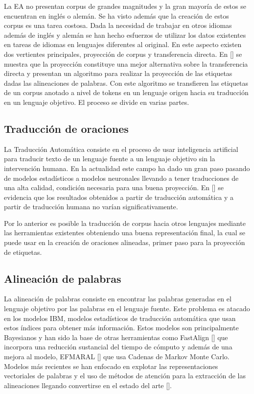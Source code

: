 La EA no presentan corpus de grandes magnitudes y la gran mayoría de estos se encuentran en inglés o alemán. 
Se ha visto además que la creación de estos corpus es una tarea costosa. Dada la necesidad de trabajar en otros idiomas además de
inglés y alemán se han hecho esfuerzos de utilizar los datos existentes en tareas de idiomas en lenguajes 
diferentes al original. En este aspecto existen dos vertientes principales, proyección de corpus y transferencia
directa. En [\cite{eger2018cross}] se muestra que la proyección constituye una mejor alternativa sobre la transferencia
directa y presentan un algoritmo para realizar la proyección de las etiquetas dadas las alineaciones de palabras.
Con este algoritmo se transfieren las etiquetas de un corpus anotado a nivel de tokens en un lenguaje origen 
hacia su traducción en un lenguaje objetivo. El proceso se divide en varias partes.

\subsection{Traducción de oraciones}

La Traducción Automática consiste en el proceso de usar inteligencia artificial para
traducir texto de un lenguaje fuente a un lenguaje objetivo sin la intervención humana.
En la actualidad este campo ha dado un gran paso pasando de modelos estadísticos a modelos
neuronales llevando a tener traducciones de una alta calidad, condición necesaria para una
buena proyección. En [\cite{eger2018cross}] se
evidencia que los resultados obtenidos a partir de traducción automática y a partir de 
traducción humana no varían significativamente. 

Por lo anterior es posible la traducción de corpus hacia otros lenguajes mediante las
herramientas existentes obteniendo una buena representación final, la cual se puede usar en la creación de
oraciones alineadas, primer paso para la proyección de etiquetas.

\subsection{Alineación de palabras}

La alineación de palabras consiste en encontrar las palabras generadas en el lenguaje objetivo por las 
palabras en el lenguaje fuente.
Este problema es atacado en los modelos IBM, modelos estadísticos de traducción automática que usan estos 
índices para obtener más información. Estos modelos son principalmente Bayesianos y han sido la base de
otras herramientas como FastAlign [\cite{dyer2013fastalign}] que incorpora una reducción sustancial del
tiempo de cómputo y además de una mejora al modelo, EFMARAL [\cite{ostling2016efficient}] que usa
Cadenas de Markov Monte Carlo. Modelos más recientes se han enfocado en explotar las representaciones
vectoriales de palabras y el uso de métodos de atención para la extracción de las
alineaciones llegando convertirse en el estado del arte [\cite{dou2021word}].

